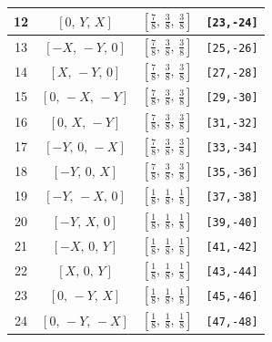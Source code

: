 \documentclass[fleqn,8pt]{jsarticle}
\begin{document}
\begin{longtable}{cccc}
12 & $\left[ 0,\, Y,\, X \right]$ & $\left[ \frac{7}{8},\, \frac{3}{8},\, \frac{3}{8} \right]$ & {\tt [23,-24]} \\ \hline
13 & $\left[ - X,\, - Y,\, 0 \right]$ & $\left[ \frac{7}{8},\, \frac{3}{8},\, \frac{3}{8} \right]$ & {\tt [25,-26]} \\ \hline
14 & $\left[ X,\, - Y,\, 0 \right]$ & $\left[ \frac{7}{8},\, \frac{3}{8},\, \frac{3}{8} \right]$ & {\tt [27,-28]} \\ \hline
15 & $\left[ 0,\, - X,\, - Y \right]$ & $\left[ \frac{7}{8},\, \frac{3}{8},\, \frac{3}{8} \right]$ & {\tt [29,-30]} \\ \hline
16 & $\left[ 0,\, X,\, - Y \right]$ & $\left[ \frac{7}{8},\, \frac{3}{8},\, \frac{3}{8} \right]$ & {\tt [31,-32]} \\ \hline
17 & $\left[ - Y,\, 0,\, - X \right]$ & $\left[ \frac{7}{8},\, \frac{3}{8},\, \frac{3}{8} \right]$ & {\tt [33,-34]} \\ \hline
18 & $\left[ - Y,\, 0,\, X \right]$ & $\left[ \frac{7}{8},\, \frac{3}{8},\, \frac{3}{8} \right]$ & {\tt [35,-36]} \\ \hline
19 & $\left[ - Y,\, - X,\, 0 \right]$ & $\left[ \frac{1}{8},\, \frac{1}{8},\, \frac{1}{8} \right]$ & {\tt [37,-38]} \\ \hline
20 & $\left[ - Y,\, X,\, 0 \right]$ & $\left[ \frac{1}{8},\, \frac{1}{8},\, \frac{1}{8} \right]$ & {\tt [39,-40]} \\ \hline
21 & $\left[ - X,\, 0,\, Y \right]$ & $\left[ \frac{1}{8},\, \frac{1}{8},\, \frac{1}{8} \right]$ & {\tt [41,-42]} \\ \hline
22 & $\left[ X,\, 0,\, Y \right]$ & $\left[ \frac{1}{8},\, \frac{1}{8},\, \frac{1}{8} \right]$ & {\tt [43,-44]} \\ \hline
23 & $\left[ 0,\, - Y,\, X \right]$ & $\left[ \frac{1}{8},\, \frac{1}{8},\, \frac{1}{8} \right]$ & {\tt [45,-46]} \\ \hline
24 & $\left[ 0,\, - Y,\, - X \right]$ & $\left[ \frac{1}{8},\, \frac{1}{8},\, \frac{1}{8} \right]$ & {\tt [47,-48]} \\
\end{longtable}
\renewcommand{\arraystretch}{1.2}
\end{document}
